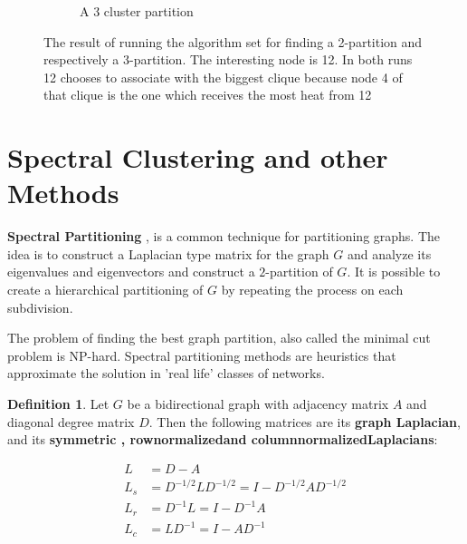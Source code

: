 \documentclass[a4paper,10pt]{article}
\theoremstyle{definition}
\newtheorem{mydef}{Definition}[section]
\theoremstyle{remark}
\theoremstyle{plain}
\begin{document}
\begin{figure}
\begin{subfigure}[b]{0.5\textwidth}
\caption{A 3 cluster partition}
\label{fig:examplecoolwarm3cluster}
\end{subfigure}
\caption{The result of running the algorithm set for finding a 2-partition and
respectively a 3-partition. The interesting node is 12. In both runs 12 chooses
to associate with the biggest clique because node 4 of that clique is the one
which receives the most heat from 12}
\label{fig:exampleCoolWarmClustering}
\end{figure}



\section{Spectral Clustering and other Methods}

\textbf{Spectral Partitioning} 
\cite{von2007tutorial, naumov2016parallel, WikipediaGraphPartition, WikipediaSpectralClustering},
is a common technique for partitioning graphs. The idea is to construct a
Laplacian type matrix \cite{WikipediaLaplacianMatrix} for the graph $G$ and
analyze its eigenvalues and eigenvectors and construct a $2$-partition of $G$.
It is possible to create a hierarchical partitioning of $G$ by repeating the
process on each subdivision.

The problem of finding the best graph partition, also called the minimal cut
problem is NP-hard. Spectral partitioning methods are heuristics that
approximate the solution in 'real life' classes of networks.

\begin{mydef}
\label{def:Laplacian}
Let $G$ be a bidirectional graph with adjacency matrix $A$ and diagonal degree
matrix $D$.
Then the following matrices are its \textbf{graph Laplacian}, and its
\textbf{symmetric\textemdash
, row\textendash normalized\textemdash and column\textendash normalized\textemdash Laplacians}:  

\begin{equation}
\begin{aligned}
L & = D - A \\
L_s & = D^{-1/2}LD^{-1/2} = I - D^{-1/2}AD^{-1/2} \\
L_r & = D^{-1}L = I - D^{-1}A \\
L_c & = LD^{-1} = I - AD^{-1}
\end{aligned}
\end{equation}
\end{mydef}
\end{document}
